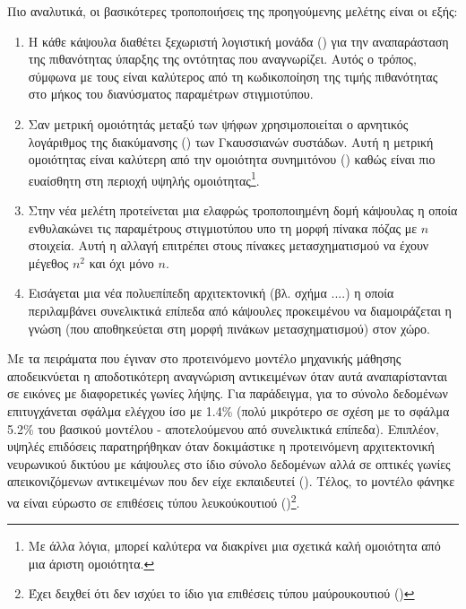 Πιο αναλυτικά, οι βασικότερες τροποποιήσεις της προηγούμενης μελέτης είναι οι εξής:
\begin{enumerate}
    \item Η κάθε κάψουλα διαθέτει ξεχωριστή λογιστική μονάδα () για την αναπαράσταση της πιθανότητας ύπαρξης της οντότητας που αναγνωρίζει. Αυτός ο τρόπος, σύμφωνα με τους \cite{hinton2018matrix} είναι καλύτερος από τη κωδικοποίηση της τιμής πιθανότητας στο μήκος του διανύσματος παραμέτρων στιγμιοτύπου.
    \item Σαν μετρική ομοιότητάς μεταξύ των ψήφων χρησιμοποιείται ο αρνητικός λογάριθμος της διακύμανσης () των Γκαυσσιανών συστάδων. Αυτή η μετρική ομοιότητας είναι καλύτερη από την ομοιότητα συνημιτόνου () καθώς είναι πιο ευαίσθητη στη περιοχή υψηλής ομοιότητας\footnote{Με άλλα λόγια, μπορεί καλύτερα να διακρίνει μια σχετικά καλή ομοιότητα από μια άριστη ομοιότητα.}.
    \item Στην νέα μελέτη προτείνεται μια ελαφρώς τροποποιημένη δομή κάψουλας η οποία ενθυλακώνει τις παραμέτρους στιγμιοτύπου υπο τη μορφή πίνακα πόζας με $n$ στοιχεία. Αυτή η αλλαγή επιτρέπει στους πίνακες μετασχηματισμού να έχουν μέγεθος $n^2$ και όχι μόνο $n$.
    \item Εισάγεται μια νέα πολυεπίπεδη αρχιτεκτονική (βλ. σχήμα ....) η οποία περιλαμβάνει συνελικτικά επίπεδα από κάψουλες προκειμένου να διαμοιράζεται η γνώση (που αποθηκεύεται στη μορφή πινάκων μετασχηματισμού) στον χώρο.
\end{enumerate}\par

Με τα πειράματα που έγιναν στο προτεινόμενο μοντέλο μηχανικής μάθησης αποδεικνύεται η αποδοτικότερη αναγνώριση αντικειμένων όταν αυτά αναπαρίστανται σε εικόνες με διαφορετικές γωνίες λήψης. Για παράδειγμα, για το σύνολο δεδομένων  επιτυγχάνεται σφάλμα ελέγχου ίσο με 1.4\% (πολύ μικρότερο σε σχέση με το σφάλμα 5.2\% του βασικού μοντέλου - αποτελούμενου από συνελικτικά επίπεδα). Επιπλέον, υψηλές επιδόσεις παρατηρήθηκαν όταν δοκιμάστικε η προτεινόμενη αρχιτεκτονική νευρωνικού δικτύου με κάψουλες στο ίδιο σύνολο δεδομένων αλλά σε οπτικές γωνίες απεικονιζόμενων αντικειμένων που δεν είχε εκπαιδευτεί (). Τέλος, το μοντέλο φάνηκε να είναι εύρωστο σε επιθέσεις τύπου λευκού\textendash κουτιού ()\cite{goodfellow2014explaining}\footnote{Έχει δειχθεί ότι δεν ισχύει το ίδιο για επιθέσεις τύπου μαύρου\textendash κουτιού ()}. 


